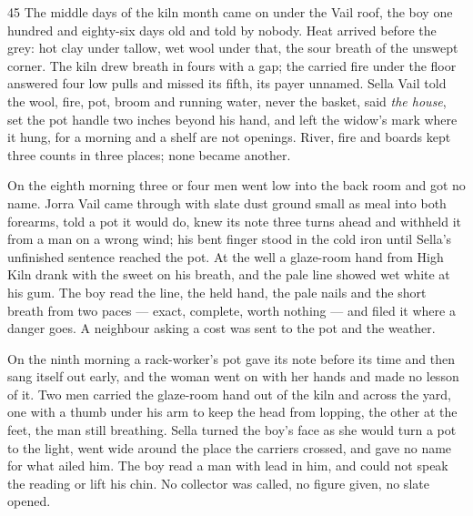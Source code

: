 
\scenebreak


\scenebreak


\scenebreak

\CRtailpiece
\begin{CRchronicle}{45}
The middle days of the kiln month came on under the Vail roof, the boy one hundred and eighty-six days old and told by nobody. Heat arrived before the grey: hot clay under tallow, wet wool under that, the sour breath of the unswept corner. The kiln drew breath in fours with a gap; the carried fire under the floor answered four low pulls and missed its fifth, its payer unnamed. Sella Vail told the wool, fire, pot, broom and running water, never the basket, said \emph{the house}, set the pot handle two inches beyond his hand, and left the widow’s mark where it hung, for a morning and a shelf are not openings. River, fire and boards kept three counts in three places; none became another.

On the eighth morning three or four men went low into the back room and got no name. Jorra Vail came through with slate dust ground small as meal into both forearms, told a pot it would do, knew its note three turns ahead and withheld it from a man on a wrong wind; his bent finger stood in the cold iron until Sella’s unfinished sentence reached the pot. At the well a glaze-room hand from High Kiln drank with the sweet on his breath, and the pale line showed wet white at his gum. The boy read the line, the held hand, the pale nails and the short breath from two paces --- exact, complete, worth nothing --- and filed it where a danger goes. A neighbour asking a cost was sent to the pot and the weather.

On the ninth morning a rack-worker’s pot gave its note before its time and then sang itself out early, and the woman went on with her hands and made no lesson of it. Two men carried the glaze-room hand out of the kiln and across the yard, one with a thumb under his arm to keep the head from lopping, the other at the feet, the man still breathing. Sella turned the boy’s face as she would turn a pot to the light, went wide around the place the carriers crossed, and gave no name for what ailed him. The boy read a man with lead in him, and could not speak the reading or lift his chin. No collector was called, no figure given, no slate opened.


\end{CRchronicle}

